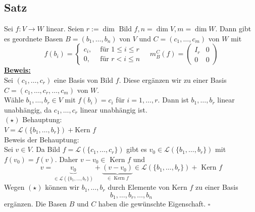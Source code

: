 \subsection{Satz} %
\label{sub:satz}
Sei $f: V \to W$ linear. Seien $r:= \dim \text{ Bild } f, n= \dim V, m = \dim W$. Dann gibt es geordnete Basen 
$B=(b_1, \ldots , b_n)$ von $V$ und $C=(c_1, \ldots , c_m)$ von $W$ mit 
\[
	f(b_i)= 
	\begin{cases}
		c_i , &\text{ für } 1 \le i \le r \\
		0 , &\text{ für } r < i \le n
	\end{cases} \quad m_B^C(f)= 
	\begin{pmatrix}
		I_r & 0 \\
		0 & 0
	\end{pmatrix}
\]
\underline{\textbf{Beweis:}} \\
Sei $(c_1, \ldots , c_r)$ eine Basis von Bild $f$. Diese ergänzen wir zu einer Basis $C=(c_1, \ldots , c_r , \ldots , c_m)$ von $W$. \\
Wähle $b_1, \ldots , b_r \in V$ mit $f(b_i)=c_i$ für $i=1, \ldots , r$. Dann ist $b_1, \ldots , b_r$ linear unabhängig, da
$c_1, \ldots , c_r$ linear unabhängig ist.
\vspace{10pt} \\
$(\star)$ Behauptung: \\
$V=\mathcal{L} (\{b_1, \ldots , b_r \}) + \text{Kern }f$ \\
Beweis der Behauptung: \\
Sei $v \in V$. Da Bild $f= \mathcal{L} (\{c_1, \ldots , c_r \})$ gibt es $v_0 \in \mathcal{L} ( \{ b_1, \ldots , b_r \})$
mit $f(v_0)=f(v)$. Daher $v-v_0 \in \text{ Kern }f$ und 
\[
	v= \underbrace{v_0}_{\in \mathcal{L} ( \{ b_1, \ldots , b_r \})}+ \underbrace{(v-v_0)}_{\in \text{ Kern }f}
	 \in \mathcal{L} (\{ b_1, \ldots , b_r\}) + \text{ Kern }f
\]
Wegen $(\star)$ können wir $b_1, \ldots , b_r$ durch Elemente von Kern $f$ zu einer Basis 
\[
	b_1, \ldots , b_r, \ldots , b_n 
\]
ergänzen. Die Basen $B$ und $C$ haben die gewünschte Eigenschaft. \hfill \( \square \)


